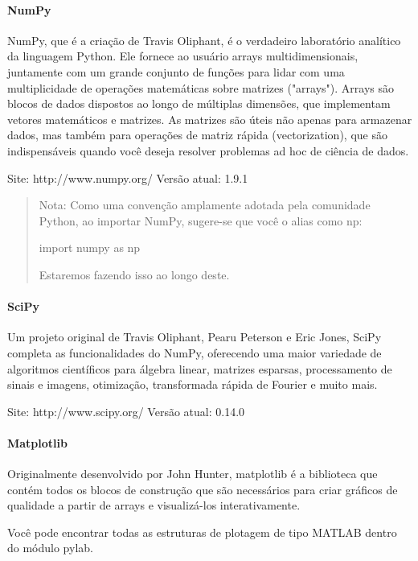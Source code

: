 \documentclass[11pt]{article}
\begin{document}
\paragraph{NumPy }\label{numpy}

NumPy, que é a criação de Travis Oliphant, é o verdadeiro laboratório
analítico da linguagem Python. Ele fornece ao usuário arrays
multidimensionais, juntamente com um grande conjunto de funções para
lidar com uma multiplicidade de operações matemáticas sobre matrizes
("arrays"). Arrays são blocos de dados dispostos ao longo de múltiplas
dimensões, que implementam vetores matemáticos e matrizes. As matrizes
são úteis não apenas para armazenar dados, mas também para operações de
matriz rápida (vectorization), que são indispensáveis quando você deseja
resolver problemas ad hoc de ciência de dados.

Site: http://www.numpy.org/ Versão atual: 1.9.1

\begin{quote}
Nota: Como uma convenção amplamente adotada pela comunidade Python, ao
importar NumPy, sugere-se que você o alias como np:

import numpy as np

Estaremos fazendo isso ao longo deste.
\end{quote}

\paragraph{SciPy }\label{scipy}

Um projeto original de Travis Oliphant, Pearu Peterson e Eric Jones,
SciPy completa as funcionalidades do NumPy, oferecendo uma maior
variedade de algoritmos científicos para álgebra linear, matrizes
esparsas, processamento de sinais e imagens, otimização, transformada
rápida de Fourier e muito mais.

Site: http://www.scipy.org/ Versão atual: 0.14.0

\paragraph{Matplotlib }\label{matplotlib}

Originalmente desenvolvido por John Hunter, matplotlib é a biblioteca
que contém todos os blocos de construção que são necessários para criar
gráficos de qualidade a partir de arrays e visualizá-los
interativamente.

Você pode encontrar todas as estruturas de plotagem de tipo MATLAB
dentro do módulo pylab.
\end{document}
